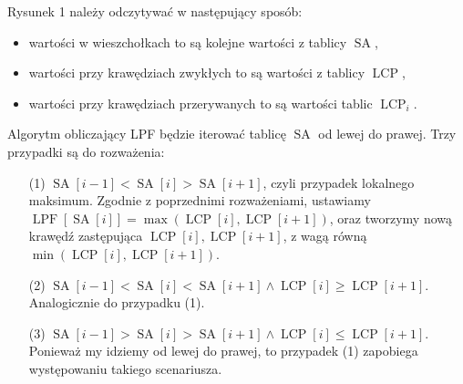 \documentclass[a4paper,12pt]{article}
\theoremstyle{definition}
\DeclareMathOperator{\SA}{SA}
\DeclareMathOperator{\LCP}{LCP}
\DeclareMathOperator{\LPF}{LPF}
\begin{document}
\pagebreak

Rysunek 1 należy odczytywać w następujący sposób:
\begin{itemize}
\item wartości w wieszchołkach to są kolejne wartości z tablicy $\SA$,
\item wartości przy krawędziach zwykłych to są wartości z tablicy $\LCP$,
\item wartości przy krawędziach przerywanych to są wartości tablic $\LCP_{i}$.
\end{itemize}

Algorytm obliczający LPF będzie iterować tablicę $\SA$ od lewej do prawej.
Trzy przypadki są do rozważenia:

\begin{enumerate}
\item[(1)] $\SA[i - 1] < \SA[i] > \SA[i + 1]$, czyli przypadek lokalnego maksimum.
  Zgodnie z poprzednimi rozważeniami, ustawiamy $\LPF[\SA[i]] = \max(\LCP[i], \LCP[i + 1])$, oraz
  tworzymy nową krawędź zastępująca $\LCP[i], \LCP[i + 1]$, z wagą równą $\min(\LCP[i], \LCP[i + 1])$.
\item[(2)] $\SA[i - 1] < \SA[i] < \SA[i + 1] \land \LCP[i] \geq \LCP[i + 1]$.
  Analogicznie do przypadku (1).
\item[(3)] $\SA[i - 1] > \SA[i] > \SA[i + 1] \land \LCP[i] \leq \LCP[i + 1]$.
  Ponieważ my idziemy od lewej do prawej, to przypadek (1) zapobiega występowaniu takiego scenariusza.



\end{enumerate}
\end{document}

